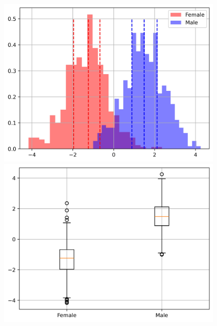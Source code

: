 \documentclass[11pt]{article}
\begin{document}
\begin{figure}[H]
{\begin{minipage}[b]{0.3\textwidth}
            \includegraphics[width=1\textwidth]{../Analysis/LDA/node=25_size=480_step=180_rho=0.1/hist.jpg}
            \includegraphics[width=1\textwidth]{../Analysis/LDA/node=25_size=480_step=180_rho=0.1/box.jpg}
        \end{minipage}
    }
\end{figure}
\end{document}
